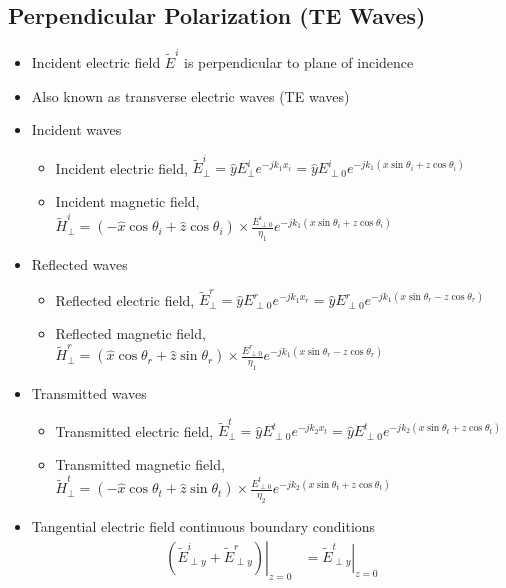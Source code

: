 \documentclass[a4paper]{article}
\begin{document}
\subsection{Perpendicular Polarization (TE Waves)}
\begin{itemize}
    \item Incident electric field $\widetilde{E}^i$ is perpendicular to plane of incidence
    \item Also known as transverse electric waves (TE waves)
    \item Incident waves
    \begin{itemize}[label=$\circ$]
        \item Incident electric field, $\widetilde{E}^i_\perp = \hat{y}E^i_\perp e^{-jk_1x_i} = \hat{y}E^i_{\perp 0} e^{-jk_1(x\sin\theta_i+z\cos\theta_i)}$
        \item Incident magnetic field, $\widetilde{H}^i_\perp = (-\hat{x}\cos\theta_i+\hat{z}\cos\theta_i)\times\displaystyle\frac{E^i_{\perp 0}}{\eta_1}e^{-jk_1(x\sin\theta_i+z\cos\theta_i)}$
    \end{itemize}
    \item Reflected waves
    \begin{itemize}[label=$\circ$]
        \item Reflected electric field, $\widetilde{E}^r_\perp = \hat{y}E^r_{\perp 0}e^{-jk_1x_r} = \hat{y}E^r_{\perp 0}e^{-jk_1(x\sin\theta_r-z\cos\theta_r)}$
        \item Reflected magnetic field, $\widetilde{H}^r_\perp = (\hat{x}\cos\theta_r+\hat{z}\sin\theta_r)\times\displaystyle\frac{E^r_{\perp 0}}{\eta_1}e^{-jk_1(x\sin\theta_r - z\cos\theta_r)}$
    \end{itemize}
    \item Transmitted waves
    \begin{itemize}[label=$\circ$]
        \item Transmitted electric field, $\widetilde{E}^t_\perp = \hat{y}E^t_{\perp 0}e^{-jk_2x_t} = \hat{y}E^t_{\perp 0}e^{-jk_2(x\sin\theta_t+z\cos\theta_t)}$
        \item Transmitted magnetic field, $\widetilde{H}^t_\perp = (-\hat{x}\cos\theta_t+\hat{z}\sin\theta_t)\times\displaystyle\frac{E^t_{\perp 0}}{\eta_2}e^{-jk_2(x\sin\theta_t+z\cos\theta_t)}$
    \end{itemize}
    \item Tangential electric field continuous boundary conditions
    \begin{align*}
        \left.(\widetilde{E}^i_{\perp y}+\widetilde{E}^r_{\perp y})\right|_{z=0} &= \left.\widetilde{E}^t_{\perp y}\right|_{z=0}\\

\end{align*}
\end{itemize}
\end{document}
